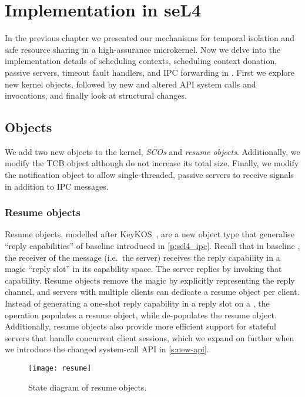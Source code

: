 \chapter{Implementation in seL4}
\label{chap:implementation}

In the previous chapter we presented our mechanisms for temporal isolation and safe resource sharing
in a high-assurance microkernel. 
Now we delve into the implementation details of scheduling contexts, scheduling context donation,
passive servers, timeout fault handlers, and IPC forwarding in \selfour. First we explore new kernel
objects, followed by new and altered API system calls and invocations, and finally look at structural changes.

\section{Objects}

We add two new objects to the kernel, \emph{\glspl{SCO}} and \emph{resume objects}. Additionally, we modify
the \gls{TCB} object although do not increase its total size. Finally, we modify the notification
object to allow single-threaded, passive servers to receive signals in
addition to IPC messages.

\subsection{Resume objects}
\label{s:resume}

Resume objects, modelled after KeyKOS~\citep{Bomberger_FFHLS_92}, are a new object type that
generalise ``reply capabilities'' of baseline \selfour introduced in \cref{p:sel4_ipc}.  Recall that in
baseline \selfour, the receiver of the message (i.e.\ the server) receives the reply capability in a
magic ``reply slot'' in its capability space. The server replies by invoking that capability. Resume
objects remove the magic by explicitly representing the reply channel, and servers with multiple
clients can dedicate a resume object per client.  Instead of generating a one-shot reply capability
in a reply slot on a \call, the operation populates a resume object, while \recv de-populates the
resume object.  Additionally, resume objects also provide more efficient support for stateful servers that handle concurrent
client sessions, which we expand on further when we introduce the changed system-call \gls{API} in
\cref{s:new-api}.

\begin{figure}[t]
    \centering
    \texttt{[image: resume]}
    \caption{State diagram of resume objects.}
    \label{f:resume-state-diagram}
\end{figure}

